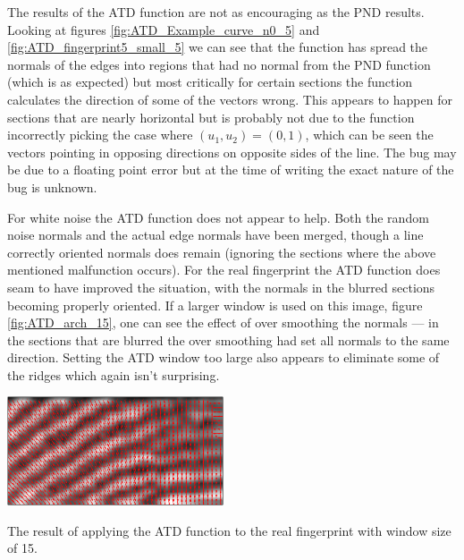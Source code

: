 \documentclass[11pt,a4paper]{article}
\makeatletter
\newenvironment{figurehere}
    {\def\@captype{figure}}
    {}
\makeatother
\begin{document}
\begin{multicols}{2}
		The results of the ATD function are not as encouraging as the PND results. Looking at figures \ref{fig:ATD_Example_curve_n0_5} and \ref{fig:ATD_fingerprint5_small_5} we can see that the function has spread the normals of the edges into regions that had no normal from the PND function (which is as expected) but most critically for certain sections the function calculates the direction of some of the vectors wrong. This appears to happen for sections that are nearly horizontal but is probably not due to the function incorrectly picking the case where $(u_1, u_2) = (0, 1)$, which can be seen the vectors pointing in opposing directions on opposite sides of the line. The bug may be due to a floating point error but at the time of writing the exact nature of the bug is unknown.

		For white noise the ATD function does not appear to help. Both the random noise normals and the actual edge normals have been merged, though a line correctly oriented normals does remain (ignoring the sections where the above mentioned malfunction occurs). For the real fingerprint the ATD function does seam to have improved the situation, with the normals in the blurred sections becoming properly oriented. If a larger window is used on this image, figure \ref{fig:ATD_arch_15}, one can see the effect of over smoothing the normals --- in the sections that are blurred the over smoothing had set all normals to the same direction. Setting the ATD window too large also appears to eliminate some of the ridges which again isn't surprising.

\begin{figurehere}
\centering
\includegraphics[width = 0.48\textwidth]{ATD_arch_15}
\caption{The result of applying the ATD function to the real fingerprint with window size of 15.}
\label{fig:ATD_arch_15}
\end{figurehere}


\end{multicols}
\end{document}
